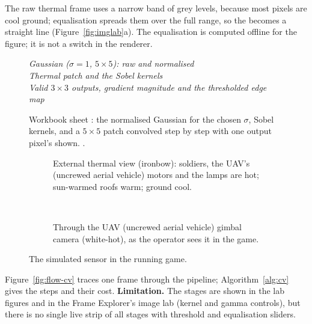 The raw thermal frame uses a narrow band of grey levels, because most pixels are cool ground; equalisation spreads them
over the full range, so the  becomes a straight line (Figure~\ref{fig:imglab}a). The equalisation is computed
offline for the figure; it is not a switch in the renderer.

\begin{figure}[htbp]
\centering
{\footnotesize\textit{Gaussian ($\sigma=1$, $5\times5$): raw and normalised}}\\[0.5mm]
{\footnotesize\textit{Thermal patch and the Sobel kernels}}\\[0.5mm]
{\footnotesize\textit{Valid $3\times3$ outputs, gradient magnitude and the thresholded edge map}}\\[0.5mm]
\caption{Workbook sheet : the normalised Gaussian for the chosen $\sigma$, Sobel kernels, and a
$5\times5$ patch convolved step by step with one output pixel's  shown. .}
\label{fig:wb-kernels}
\end{figure}

\begin{figure}[htbp]
\centering
\begin{subfigure}[t]{\linewidth}\caption{External thermal view (ironbow): soldiers, the
UAV's (uncrewed aerial vehicle) motors and the lamps are hot; sun-warmed roofs warm; ground cool.}\end{subfigure}\\[1.5mm]
\begin{subfigure}[t]{\linewidth}\caption{Through the UAV (uncrewed aerial vehicle) gimbal camera (white-hot), as the
operator sees it in the game.}\end{subfigure}
\caption{The simulated sensor in the running game.}
\label{fig:thermal}
\end{figure}

Figure~\ref{fig:flow-cv} traces one  frame through the pipeline; Algorithm~\ref{alg:cv} gives the steps and their cost.
\textbf{Limitation.} The stages are shown in the lab figures and in the Frame Explorer's image lab (kernel and gamma
controls), but there is no single live strip of all stages with threshold and equalisation sliders.

\flowCv
\algCv
